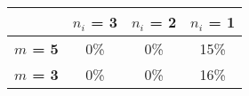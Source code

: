 \begin{tabular}{|l|c|c|c|}
\hline
&\textbf{$n_i$ = 3}&\textbf{$n_i$ = 2}&\textbf{$n_i$ = 1}\\\hline
\textbf{$m$ = 5}&0\%&0\%&15\%\\\hline
\textbf{$m$ = 3}&0\%&0\%&16\%\\\hline
\end{tabular}
